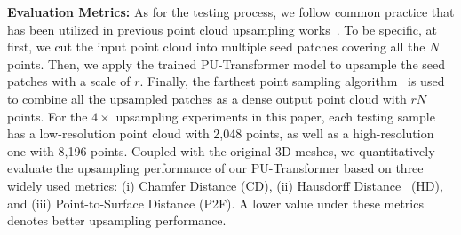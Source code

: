 \noindent \textbf{Evaluation Metrics:}
As for the testing process, we follow common practice that has been utilized in previous point cloud upsampling works~\cite{yifan2019patch,li2019pu,li2021point,qian2021pu}. To be specific, at first, we cut the input point cloud into multiple seed patches covering all the $N$ points. Then, we apply the trained PU-Transformer model to upsample the seed patches with a scale of $r$. Finally, the farthest point sampling algorithm~\cite{qi2017pointnet} is used to combine all the upsampled patches as a dense output point cloud with $rN$ points. For the $4\times$ upsampling experiments in this paper, each testing sample has a low-resolution point cloud with 2,048 points, as well as a high-resolution one with 8,196 points. Coupled with the original 3D meshes, we quantitatively evaluate the upsampling performance of our PU-Transformer based on three widely used metrics: (i) Chamfer Distance (CD), (ii) Hausdorff Distance~\cite{berger2013benchmark} (HD), and (iii) Point-to-Surface Distance (P2F). A lower value under these metrics denotes better upsampling performance.


